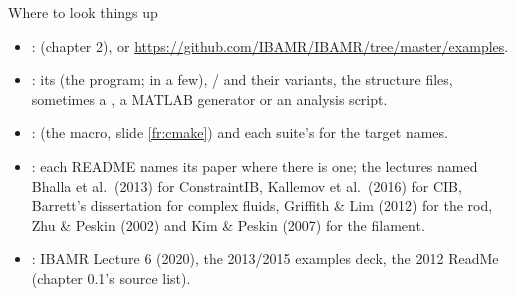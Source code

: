 \documentclass[aspectratio=169,11pt]{beamer}
\begin{document}
\begin{frame}{Where to look things up}
\label{fr:lookup}
\small
\begin{itemize}
  \item {}:  (chapter 2), or \url{https://github.com/IBAMR/IBAMR/tree/master/examples}.
  \item {}: its  (the program;  in a few), / and their variants, the structure files, sometimes a , a MATLAB generator or an analysis script.
  \item {}:  (the  macro, slide \ref{fr:cmake}) and each suite's  for the target names.
  \item {}: each README names its paper where there is one; the lectures named Bhalla et al.\ (2013) for ConstraintIB, Kallemov et al.\ (2016) for CIB, Barrett's dissertation for complex fluids, Griffith \& Lim (2012) for the rod, Zhu \& Peskin (2002) and Kim \& Peskin (2007) for the filament.
  \item {}: IBAMR Lecture 6 (2020), the 2013/2015 examples deck, the 2012 ReadMe (chapter 0.1's source list).
\end{itemize}
\end{frame}
\end{document}
